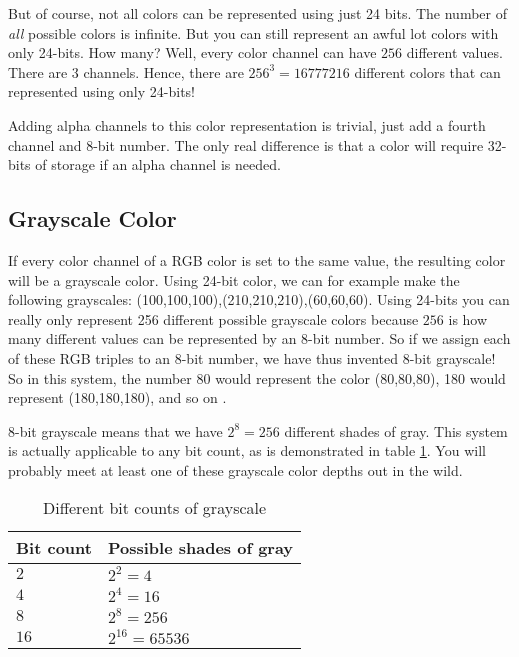   But of course, not all colors can be represented using just
  24 bits. The number of \textit{all} possible colors is infinite. But you can still
  represent an awful lot colors with only 24-bits. How many? Well, every
  color channel can have $256$ different values. There are $3$
  channels. Hence, there are $256^3 = 16777216$ different colors that
  can represented using only 24-bits!

  \newcommand{\rgbaquad}[4]{
    \mbox{(\textcolor{red}{#1},\textcolor{green}{#2},\textcolor{blue}{#3},\textcolor{gray}{#4})}}

  Adding alpha channels to this color representation is trivial, just
  add a fourth channel and 8-bit number. The only real
  difference is that a color will require 32-bits of storage if an
  alpha channel is needed.

  \subsection{Grayscale Color}

  \newcommand{\selfrgbtrip}[3]{\mbox{\textcolor[RGB]{#1,#2,#3}{(#1,#2,#3)}}}
  \newcommand{\selfrgbtripgray}[1]{\selfrgbtrip{#1}{#1}{#1}}

  If every color channel of a RGB color is set to the same value, the
  resulting color will be a grayscale color. Using 24-bit color, we can for example make the following
  grayscales:
  \selfrgbtripgray{100},\selfrgbtripgray{210},\selfrgbtripgray{60}. Using
  24-bits you can really only represent 256 different possible
  grayscale colors because $256$ is how many different values can be
  represented by an 8-bit number. So if we assign each of these RGB
  triples to an 8-bit number, we have thus invented 8-bit
  grayscale! So in this system, the number 80
  would represent the color \selfrgbtripgray{80}, 180 would represent
  \selfrgbtripgray{180}, and so on \cite{puglia00:_handbook_dig_proj}.

  8-bit grayscale means that we have $2^8=256$ different shades of
  gray. This system is actually applicable to any bit count, as is
  demonstrated in table \ref{tab:grayscale}. You will probably meet at least one of
  these grayscale color depths out in the wild.

  \begin{table}
    \centering
    \begin{tabular}{ll}
      \toprule
      Bit count & Possible shades of gray \\
      \midrule
      $2$ & $2^2 = 4$ \\
      $4$ & $2^4 = 16$ \\
      $8$ & $2^8 = 256$ \\
      $16$ & $2^{16} = 65536$ \\
      \bottomrule
    \end{tabular}
    \caption{Different bit counts of grayscale}
    \label{tab:grayscale}
  \end{table}

